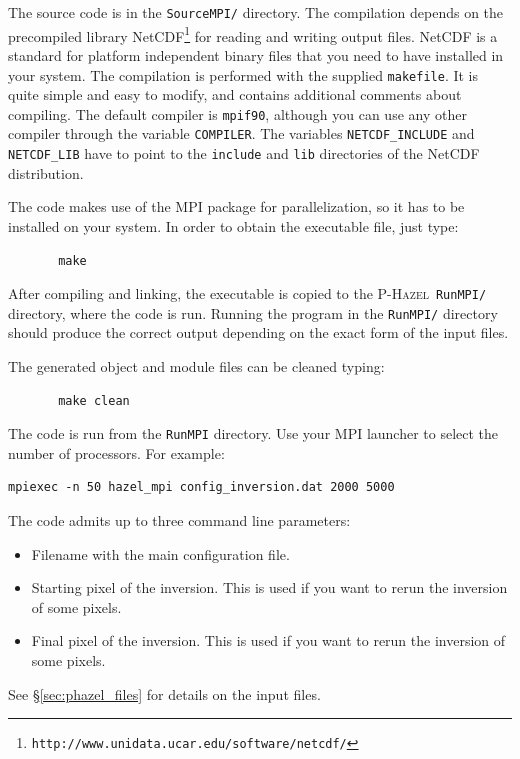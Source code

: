 \documentclass[12pt]{article}
\def\HM{\textsc{P-Hazel}}
\begin{document}
The source code is in the \texttt{SourceMPI/} directory. The compilation depends
on the precompiled library NetCDF\footnote{\texttt{http://www.unidata.ucar.edu/software/netcdf/}}
for reading and writing output files. NetCDF is a standard for platform independent
binary files that you need to have installed in your system. The compilation is performed
with the supplied \texttt{makefile}. It is quite simple and easy to modify, and
contains additional comments about compiling. The
default compiler is \texttt{mpif90}, although you can use any other
compiler through the variable \texttt{COMPILER}.
The variables \texttt{NETCDF\_INCLUDE} and \texttt{NETCDF\_LIB} have to point to the
\texttt{include} and \texttt{lib} directories of the NetCDF distribution.

The code makes use of the MPI package for parallelization, so it has
to be installed on your system. 
In order to obtain the executable file, just type:
\begin{verbatim}
       make
\end{verbatim}
After compiling and linking, the executable is copied to the \HM\ \texttt{RunMPI/} 
directory, where the code is run. Running the
program in the \texttt{RunMPI/} directory should produce the correct output 
depending on the exact form of the input files.

The generated object and module files can be cleaned typing:
\begin{verbatim}
       make clean
\end{verbatim}

The code is run from the \texttt{RunMPI} directory. Use your MPI launcher to select
the number of processors. For example:
\begin{verbatim}
mpiexec -n 50 hazel_mpi config_inversion.dat 2000 5000
\end{verbatim}
The code admits up to three command line parameters:
\begin{itemize}
\item Filename with the main configuration file.
\item Starting pixel of the inversion. This is used if you want to rerun the inversion of
some pixels.
\item Final pixel of the inversion. This is used if you want to rerun the inversion of
some pixels.
\end{itemize}
See \S\ref{sec:phazel_files} for details on the input files.

\end{document}
